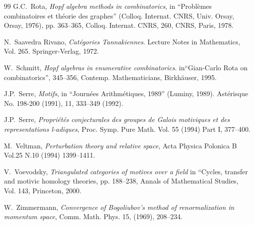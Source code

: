 \documentclass[10pt]{amsart}
\numberwithin{equation}{section}
\begin{document}
\begin{thebibliography}{99}
 G.C.~Rota, {\em Hopf algebra methods in
combinatorics},
in ``Probl\`emes combinatoires et th\'eorie des graphes''
(Colloq. Internat. CNRS, Univ. Orsay, Orsay, 1976),
pp. 363--365, Colloq. Internat. CNRS, 260, CNRS, Paris, 1978.

 N.~Saavedra Rivano, {\em Cat\'egories Tannakiennes}.
Lecture Notes in Mathematics, Vol. 265. Springer-Verlag, 1972.

 W.~Schmitt, {\em Hopf algebras in enumerative
combinatorics}. in``Gian-Carlo Rota on combinatorics'', 345--356,
Contemp. Mathematicians, Birkh\"auser, 1995.

 J.P.~Serre, {\em Motifs}, in ``Journ\'ees
Arithm\'etiques, 1989'' (Luminy, 1989).  Ast\'erisque  No. 198-200
(1991), 11, 333--349 (1992).

 J.P.~Serre, {\em Propri\'et\'es conjecturales des
groupes de Galois motiviques et des representations l-adiques},
Proc. Symp. Pure Math. Vol. 55 (1994) Part I,
377--400.

 M.~Veltman, {\em Perturbation theory and relative
space}, Acta Physica Polonica B Vol.25 N.10 (1994) 1399--1411.

 V.~Voevodsky, {\em Triangulated categories of
motives over a field} in ``Cycles, transfer and motivic homology
theories, pp. 188--238, Annals of Mathematical Studies, Vol. 143,
Princeton, 2000.

 W.~Zimmermann, {\em Convergence of Bogoliubov's method
 of renormalization in momentum space}, Comm. Math. Phys. 15, (1969),
 208--234.



\end{thebibliography}
\end{document}
